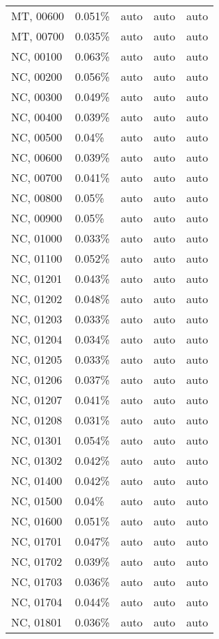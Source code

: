 \begin{longtable}[]{@{}lllll@{}}
MT, 00600 & 0.051\% & auto & auto & auto \\
MT, 00700 & 0.035\% & auto & auto & auto \\
NC, 00100 & 0.063\% & auto & auto & auto \\
NC, 00200 & 0.056\% & auto & auto & auto \\
NC, 00300 & 0.049\% & auto & auto & auto \\
NC, 00400 & 0.039\% & auto & auto & auto \\
NC, 00500 & 0.04\% & auto & auto & auto \\
NC, 00600 & 0.039\% & auto & auto & auto \\
NC, 00700 & 0.041\% & auto & auto & auto \\
NC, 00800 & 0.05\% & auto & auto & auto \\
NC, 00900 & 0.05\% & auto & auto & auto \\
NC, 01000 & 0.033\% & auto & auto & auto \\
NC, 01100 & 0.052\% & auto & auto & auto \\
NC, 01201 & 0.043\% & auto & auto & auto \\
NC, 01202 & 0.048\% & auto & auto & auto \\
NC, 01203 & 0.033\% & auto & auto & auto \\
NC, 01204 & 0.034\% & auto & auto & auto \\
NC, 01205 & 0.033\% & auto & auto & auto \\
NC, 01206 & 0.037\% & auto & auto & auto \\
NC, 01207 & 0.041\% & auto & auto & auto \\
NC, 01208 & 0.031\% & auto & auto & auto \\
NC, 01301 & 0.054\% & auto & auto & auto \\
NC, 01302 & 0.042\% & auto & auto & auto \\
NC, 01400 & 0.042\% & auto & auto & auto \\
NC, 01500 & 0.04\% & auto & auto & auto \\
NC, 01600 & 0.051\% & auto & auto & auto \\
NC, 01701 & 0.047\% & auto & auto & auto \\
NC, 01702 & 0.039\% & auto & auto & auto \\
NC, 01703 & 0.036\% & auto & auto & auto \\
NC, 01704 & 0.044\% & auto & auto & auto \\
NC, 01801 & 0.036\% & auto & auto & auto \\

\end{longtable}
